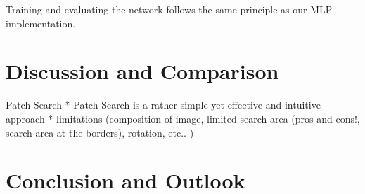 \documentclass[]{article}
\begin{document}
Training and evaluating the network follows the same principle as our
MLP implementation.

\section{Discussion and Comparison}\label{discussion-and-comparison}

Patch Search * Patch Search is a rather simple yet effective and
intuitive approach * limitations (composition of image, limited search
area (pros and cons!, search area at the borders), rotation, etc.. )

\section{Conclusion and Outlook}\label{conclusion-and-outlook}
\end{document}
